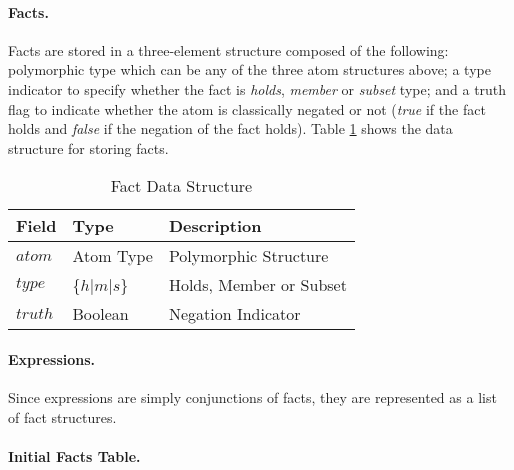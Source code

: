 \documentclass[11pt]{report}
\begin{document}
          \paragraph{Facts.}

            Facts are stored in a three-element structure composed of the
            following: polymorphic type which can be any of the three atom
            structures above; a type indicator to specify whether the fact is
            {\em holds}, {\em member} or {\em subset} type; and a truth flag
            to indicate whether the atom is classically negated or not
            ({\em true} if the fact holds and {\em false} if the negation of
            the fact holds). Table \ref{tabl-polup-fadsr} shows the data
            structure for storing facts.

            \begin{table}[tbhp]
              \begin{center}
                \begin{tabular}[t]{|l|l|l|}
                  \hline
                  \textbf{Field} & \textbf{Type}       & \textbf{Description} \\
                  \hline
                  $atom$         & Atom Type           & Polymorphic Structure \\
                  \hline
                  $type$         & \{$h$$|$$m$$|$$s$\} & Holds, Member or Subset \\
                  \hline
                  $truth$        & Boolean             & Negation Indicator \\
                  \hline
                \end{tabular}
              \end{center}
              \caption{Fact Data Structure}
              \label{tabl-polup-fadsr}
            \end{table}

          \paragraph{Expressions.}

            Since expressions are simply conjunctions of facts, they are
            represented as a list of fact structures.

          \paragraph{Initial Facts Table.}
\end{document}
